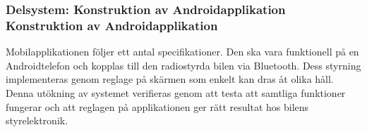 \documentclass[a4paper]{article}
\begin{document}




\subsubsection{Delsystem: Konstruktion av Androidapplikation \\ Konstruktion av Androidapplikation}
Mobilapplikationen följer ett antal specifikationer. Den ska vara funktionell på en Androidtelefon och kopplas till den radiostyrda bilen via Bluetooth. Dess styrning implementeras genom reglage på skärmen som enkelt kan dras åt olika håll. Denna utökning av systemet verifieras genom att testa att samtliga funktioner fungerar och att reglagen på applikationen ger rätt resultat hos bilens styrelektronik. 
\end{document}
